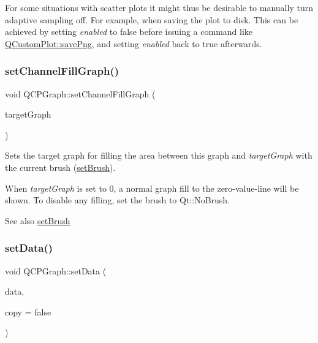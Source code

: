For some situations with scatter plots it might thus be desirable to manually turn adaptive sampling off. For example, when saving the plot to disk. This can be achieved by setting {\itshape enabled} to false before issuing a command like \mbox{\hyperlink{class_q_custom_plot_a7636261aff1f6d25c9da749ece3fc8b8}{Q\+Custom\+Plot\+::save\+Png}}, and setting {\itshape enabled} back to true afterwards. \mbox{\label{class_q_c_p_graph_a2d03156df1b64037a2e36cfa50351ca3}} 
\subsubsection{\texorpdfstring{set\+Channel\+Fill\+Graph()}{setChannelFillGraph()}}
{\footnotesize\ttfamily void Q\+C\+P\+Graph\+::set\+Channel\+Fill\+Graph (\begin{DoxyParamCaption}\item[{\mbox{\hyperlink{class_q_c_p_graph}{Q\+C\+P\+Graph}} $\ast$}]{target\+Graph }\end{DoxyParamCaption})}

Sets the target graph for filling the area between this graph and {\itshape target\+Graph} with the current brush (\mbox{\hyperlink{class_q_c_p_abstract_plottable_a7a4b92144dca6453a1f0f210e27edc74}{set\+Brush}}).

When {\itshape target\+Graph} is set to 0, a normal graph fill to the zero-\/value-\/line will be shown. To disable any filling, set the brush to Qt\+::\+No\+Brush.

\begin{DoxySeeAlso}{See also}
\mbox{\hyperlink{class_q_c_p_abstract_plottable_a7a4b92144dca6453a1f0f210e27edc74}{set\+Brush}} 
\end{DoxySeeAlso}
\mbox{\label{class_q_c_p_graph_a1df2fd710545c8ba3b2c99a39a27bf8b}} 
\subsubsection{\texorpdfstring{set\+Data()}{setData()}\hspace{0.1cm}{\footnotesize\ttfamily [1/2]}}
{\footnotesize\ttfamily void Q\+C\+P\+Graph\+::set\+Data (\begin{DoxyParamCaption}\item[{\mbox{\hyperlink{qcustomplot_8h_a84a9c4a4c2216ccfdcb5f3067cda76e3}{Q\+C\+P\+Data\+Map}} $\ast$}]{data,  }\item[{bool}]{copy = {\ttfamily false} }\end{DoxyParamCaption})}

